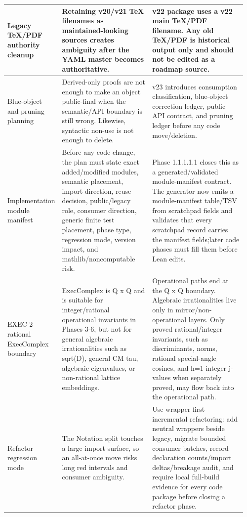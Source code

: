 \begin{longtable}{L{0.18\linewidth} L{0.38\linewidth} L{0.4\linewidth}}
\hline
\addlinespace[0.24em]
Legacy TeX/\allowbreak{}PDF authority cleanup & Retaining v20/\allowbreak{}v21 TeX filenames as maintained-looking sources creates ambiguity after the YAML master becomes authoritative. & v22 package uses a v22 main TeX/\allowbreak{}PDF filename. Any old TeX/\allowbreak{}PDF is historical output only and should not be edited as a roadmap source.\\
\hline
\addlinespace[0.24em]
Blue-object and pruning planning & Derived-only proofs are not enough to make an object public-final when the semantic/\allowbreak{}API boundary is still wrong. Likewise, syntactic non-use is not enough to delete. & v23 introduces consumption classification, blue-object correction ledger, public API contract, and pruning ledger before any code move/\allowbreak{}deletion.\\
\hline
\addlinespace[0.24em]
Implementation module manifest & Before any code change, the plan must state exact added/\allowbreak{}modified modules, semantic placement, import direction, reuse decision, public/\allowbreak{}legacy role, consumer direction, generic finite test placement, phase type, regression mode, version impact, and mathlib/\allowbreak{}noncomputable risk. & Phase 1.1.1.1.1 closes this as a generated/\allowbreak{}validated module-manifest contract. The generator now emits a module-manifest table/\allowbreak{}TSV from scratchpad fields and validates that every scratchpad record carries the manifest fields;\newline later code phases must fill them before Lean edits.\\
\hline
\addlinespace[0.24em]
EXEC-2 rational ExecComplex boundary & ExecComplex is Q x Q and is suitable for integer/\allowbreak{}rational operational invariants in Phases 3-6, but not for general algebraic irrationalities such as sqrt(D), general CM tau, algebraic eigenvalues, or non-rational lattice embeddings. & Operational paths end at the Q x Q boundary. Algebraic irrationalities live only in mirror/\allowbreak{}non-operational layers. Only proved rational/\allowbreak{}integer invariants, such as discriminants, norms, rational special-angle cosines, and h=1 integer j-values when separately proved, may flow back into the operational path.\\
\hline
\addlinespace[0.24em]
Refactor regression mode & The Notation split touches a large import surface, so an all-at-once move risks long red intervals and consumer ambiguity. & Use wrapper-first incremental refactoring: add neutral wrappers beside legacy, migrate bounded consumer batches, record declaration counts/\allowbreak{}import deltas/\allowbreak{}breakage audit, and require local full-build evidence for every code package before closing a refactor phase.\\

\end{longtable}
